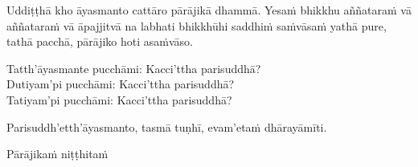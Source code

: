\medskip

\begin{center}
Uddiṭṭhā kho āyasmanto cattāro pārājikā dhammā. Yesaṁ bhikkhu aññataraṁ vā aññataraṁ vā āpajjitvā na labhati bhikkhūhi saddhiṁ saṁvāsaṁ yathā pure, tathā pacchā, pārājiko hoti asaṁvāso.

\smallskip

Tatth'āyasmante pucchāmi: Kacci'ttha parisuddhā?\\
Dutiyam'pi pucchāmi: Kacci'ttha parisuddhā?\\
Tatiyam'pi pucchāmi: Kacci'ttha parisuddhā?

\smallskip

Parisuddh'etth'āyasmanto, tasmā tuṇhī, evam'etaṁ dhārayāmīti.
\end{center}

\begin{outro}
Pārājikaṁ niṭṭhitaṁ
\end{outro}

\clearpage
